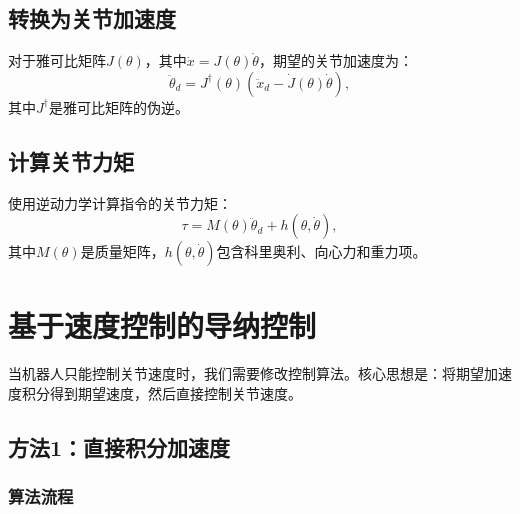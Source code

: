 \documentclass[12pt,a4paper]{article}
\begin{document}
\subsection{转换为关节加速度}

对于雅可比矩阵$J(\theta)$，其中$\dot{x} = J(\theta)\dot{\theta}$，期望的关节加速度为：
\begin{equation}
\ddot{\theta}_d = J^{\dagger}(\theta)(\ddot{x}_d - \dot{J}(\theta)\dot{\theta}), \tag{11.67}
\end{equation}
其中$J^{\dagger}$是雅可比矩阵的伪逆。

\subsection{计算关节力矩}

使用逆动力学计算指令的关节力矩：
\begin{equation}
\tau = M(\theta)\ddot{\theta}_d + h(\theta, \dot{\theta}),
\end{equation}
其中$M(\theta)$是质量矩阵，$h(\theta, \dot{\theta})$包含科里奥利、向心力和重力项。

\section{基于速度控制的导纳控制}

当机器人只能控制关节速度时，我们需要修改控制算法。核心思想是：将期望加速度积分得到期望速度，然后直接控制关节速度。

\subsection{方法1：直接积分加速度}

\subsubsection{算法流程}
\end{document}
